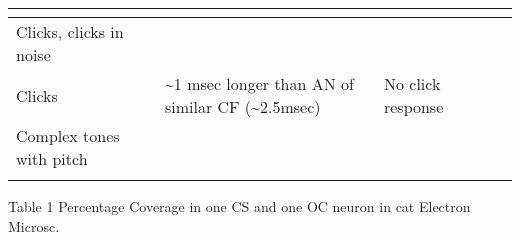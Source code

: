 \documentclass[10pt,a4paper]{article}
\begin{document}
\begin{flushleft}
\begin{supertabular}{|m{3.9609997cm}|m{2.9099998cm}|m{2.8739998cm}|m{2.846cm}|m{2.836cm}|m{2.839cm}|}
                      \citep{ClockSalviEtAl:1993}                       &                                                                          & & & \\\hline
                        Clicks, clicks in noise                         & 
                      \citep{BurkardPalmer:1997}                        &                                                                          & & & \\\hline
                                Clicks                                  &                                                                          & \~{}1 msec longer
      than AN of similar CF (\~{}2.5msec) \citep{JorisSmith:1998}       & No click
response
 \citep{GodfreyKiangEtAl:1975,GodfreyKiangEtAl:1975a,JorisSmith:1998}   &                                                                          & 
\\\hline
                       Complex tones with pitch                         & 

                     \citep{WinterPalmerEtAl:2003}                      &                                                                          & & & \\\hline
                                                                        &                                                                          & & & & \\\hline
\end{supertabular}
\end{flushleft}

Table 1 \citep{SmithRhode:1989} Percentage Coverage in one CS and one OC neuron
in cat Electron Microsc.
\end{document}
